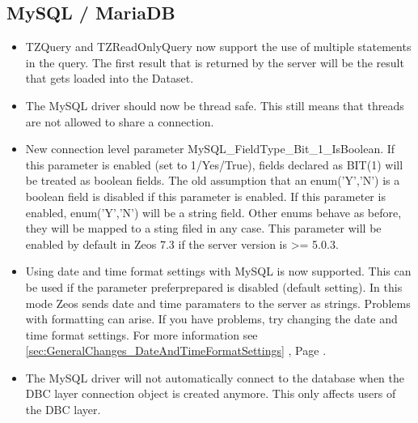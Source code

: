 \documentclass[a4paper,12pt,oneside]{article}
\begin{document}
\subsection{MySQL / MariaDB}
\label{sec:DriverSpecificChanges_MysqlMariadb}
\begin{itemize}
\item
  TZQuery and TZReadOnlyQuery now support the use of multiple statements in the query.
	The first result that is returned by the server will be the result that gets loaded into the Dataset.
\item
  The MySQL driver should now be thread safe.
	This still means that threads are not allowed to share a connection.
\item
  New connection level parameter MySQL\_FieldType\_Bit\_1\_IsBoolean.
	If this parameter is enabled (set to 1/Yes/True), fields declared as BIT(1) will be treated as boolean fields.
	The old assumption that an enum('Y','N') is a boolean field is disabled if this parameter is enabled.
	If this parameter is enabled, enum('Y','N') will be a string field.
	Other enums behave as before, they will be mapped to a sting filed in any case.
	This parameter will be enabled by default in Zeos 7.3 if the server version is \textgreater= 5.0.3.
\item
  Using date and time format settings with MySQL is now supported.
	This can be used if the parameter preferprepared is disabled (default setting).
  In this mode Zeos sends date and time paramaters to the server as strings.
	Problems with formatting can arise.
	If you have problems, try changing the date and time format settings.
	For more information see \ref{sec:GeneralChanges_DateAndTimeFormatSettings} , Page \pageref{sec:GeneralChanges_DateAndTimeFormatSettings}.
\item
  The MySQL driver will not automatically connect to the database when the DBC layer connection object is created anymore.
	This only affects users of the DBC layer.
\end{itemize}
\end{document}
